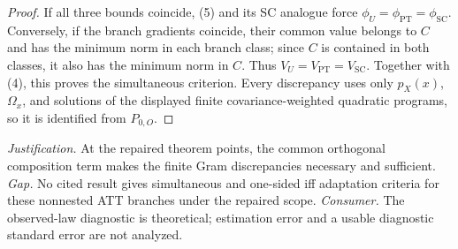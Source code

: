 \documentclass{article}
\begin{document}
\begin{proof}
If all three bounds coincide, (5) and its SC analogue force \(\phi_U=\phi_{\mathrm{PT}}=\phi_{\mathrm{SC}}\).  Conversely, if the branch gradients coincide, their common value belongs to \(C\) and has the minimum norm in each branch class; since \(C\) is contained in both classes, it also has the minimum norm in \(C\).  Thus \(V_U=V_{\mathrm{PT}}=V_{\mathrm{SC}}\).  Together with (4), this proves the simultaneous criterion.  Every discrepancy uses only \(p_X(x)\), \(\Omega_x\), and solutions of the displayed finite covariance-weighted quadratic programs, so it is identified from \(P_{0,O}\).
\end{proof}
\par\smallskip\noindent \textit{Justification.} At the repaired theorem points, the common orthogonal composition term makes the finite Gram discrepancies necessary and sufficient. \textit{Gap.} No cited result gives simultaneous and one-sided iff adaptation criteria for these nonnested ATT branches under the repaired scope. \textit{Consumer.} The observed-law diagnostic is theoretical; estimation error and a usable diagnostic standard error are not analyzed.
\end{document}
